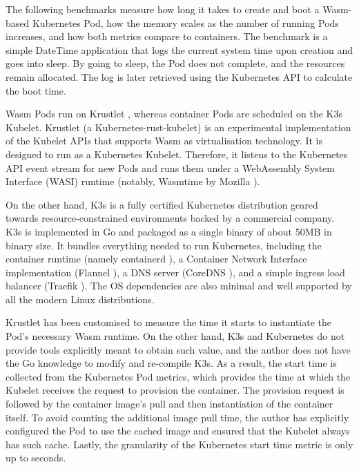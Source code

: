 The following benchmarks measure how long it takes to create and boot a Wasm-based Kubernetes Pod, how the memory scales as the number of running Pods increases, and how both metrics compare to containers. The benchmark is a simple DateTime application that logs the current system time upon creation and goes into sleep. By going to sleep, the Pod does not complete, and the resources remain allocated. The log is later retrieved using the Kubernetes API to calculate the boot time. 

Wasm Pods run on Krustlet \cite{krustlet}, whereas container Pods are scheduled on the K3s \cite{k3s} Kubelet. Krustlet (a Kubernetes-rust-kubelet) is an experimental implementation of the Kubelet APIs that supports Wasm as virtualisation technology. It is designed to run as a Kubernetes Kubelet. Therefore, it listens to the Kubernetes API event stream for new Pods and runs them under a WebAssembly System Interface (WASI) runtime (notably, Wasmtime by Mozilla \cite{wasmtime}).

On the other hand, K3s is a fully certified Kubernetes distribution geared towards resource-constrained environments backed by a commercial company. K3s is implemented in Go and packaged as a single binary of about 50MB in binary size. It bundles everything needed to run Kubernetes, including the container runtime (namely containerd \cite{containerd}), a Container Network Interface implementation (Flannel \cite{flannel}), a DNS server (CoreDNS \cite{coredns}), and a simple ingress load balancer (Traefik \cite{traefik}). The OS dependencies are also minimal and well supported by all the modern Linux distributions.

Krustlet has been customised to measure the time it starts to instantiate the Pod's necessary Wasm runtime. On the other hand, K3s and Kubernetes do not provide tools explicitly meant to obtain such value, and the author does not have the Go knowledge to modify and re-compile K3s. As a result, the start time is collected from the Kubernetes Pod metrics, which provides the time at which the Kubelet receives the request to provision the container. The provision request is followed by the container image's pull and then instantiation of the container itself. To avoid counting the additional image pull time, the author has explicitly configured the Pod to use the cached image and ensured that the Kubelet always has such cache. Lastly, the granularity of the Kubernetes start time metric is only up to seconds.

